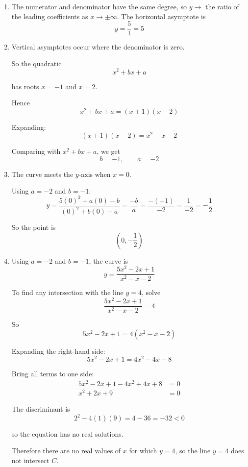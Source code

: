 \documentclass[leqno]{article}
\begin{document}
\begin{enumerate}[
  label=\textbf{\arabic*.},
  leftmargin=*,
  topsep=0pt,
  partopsep=0pt,
  parsep=0pt
]
\vspace*{10pt}

\begin{djsSolution}
\begin{enumerate}[label=\textbf{(\alph*)}]
\item The numerator and denominator have the same degree, so \(y\to\) the ratio of the leading coefficients as \(x\to\pm\infty\). The horizontal asymptote is
\[
y=\frac{5}{1}=5
\]

\item Vertical asymptotes occur where the denominator is zero.

So the quadratic
\[
x^2+bx+a
\]

has roots $x=-1$ and $x=2$.

Hence
\[
x^2+bx+a=(x+1)(x-2)
\]

Expanding:
\[
(x+1)(x-2)=x^2-x-2
\]

Comparing with $x^2+bx+a$, we get
\[
b=-1,\qquad a=-2
\]

\item The curve meets the $y$-axis when $x=0$.

Using $a=-2$ and $b=-1$:
\[
y=\frac{5(0)^2+a(0)-b}{(0)^2+b(0)+a}
=\frac{-b}{a}
=\frac{-(-1)}{-2}
=\frac{1}{-2}
=-\frac12
\]

So the point is
\[
\left(0,-\frac12\right)
\]

\item Using $a=-2$ and $b=-1$, the curve is
\[
y=\frac{5x^2-2x+1}{x^2-x-2}
\]

To find any intersection with the line $y=4$, solve
\[
\frac{5x^2-2x+1}{x^2-x-2}=4
\]

So
\[
5x^2-2x+1=4(x^2-x-2)
\]

Expanding the right-hand side:
\[
5x^2-2x+1=4x^2-4x-8
\]

Bring all terms to one side:
\begin{align*}
5x^2-2x+1-4x^2+4x+8&=0\\
x^2+2x+9&=0
\end{align*}

The discriminant is
\[
2^2-4(1)(9)=4-36=-32<0
\]

so the equation has no real solutions.

Therefore there are no real values of $x$ for which $y=4$, so the line $y=4$ does not intersect $C$.
\end{enumerate}
\end{djsSolution}


\newpage


\end{enumerate}
\end{document}
